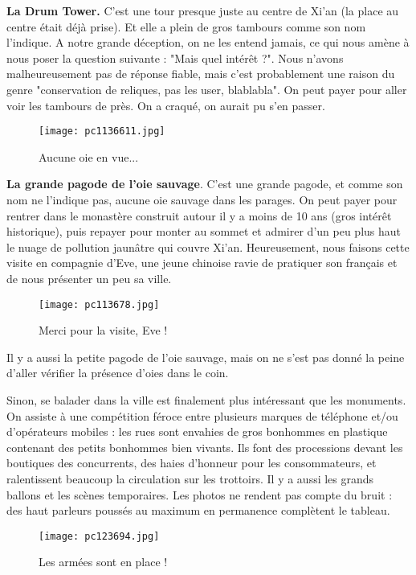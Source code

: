 \documentclass{book}
\begin{document}
\textbf{La Drum Tower.} C'est une tour presque juste au centre de Xi'an (la place au centre était déjà prise). Et elle a plein de gros tambours comme son nom l'indique. A notre grande déception, on ne les entend jamais, ce qui nous amène à nous poser la question suivante : "Mais quel intérêt ?". Nous n'avons malheureusement pas de réponse fiable, mais c'est probablement une raison du genre "conservation de reliques, pas les user, blablabla". On peut payer pour aller voir les tambours de près. On a craqué, on aurait pu s'en passer.


\begin{figure}[h]
\centering
\texttt{[image: pc1136611.jpg]}
\caption*{Aucune oie en vue...}
\end{figure}

\textbf{La grande pagode de l'oie sauvage}. C'est une grande pagode, et comme son nom ne l'indique pas, aucune oie sauvage dans les parages. On peut payer pour rentrer dans le monastère construit autour il y a moins de 10 ans (gros intérêt historique), puis repayer pour monter au sommet et admirer d'un peu plus haut le nuage de pollution jaunâtre qui couvre Xi'an. Heureusement, nous faisons cette visite en compagnie d'Eve, une jeune chinoise ravie de pratiquer son français et de nous présenter un peu sa ville.


\begin{figure}[h]
\centering
\texttt{[image: pc113678.jpg]}
\caption*{Merci pour la visite, Eve !}
\end{figure}

Il y a aussi la petite pagode de l'oie sauvage, mais on ne s'est pas donné la peine d'aller vérifier la présence d'oies dans le coin.

Sinon, se balader dans la ville est finalement plus intéressant que les monuments. On assiste à une compétition féroce entre plusieurs marques de téléphone et/ou d'opérateurs mobiles : les rues sont envahies de gros bonhommes en plastique contenant des petits bonhommes bien vivants. Ils font des processions devant les boutiques des concurrents, des haies d'honneur pour les consommateurs, et ralentissent beaucoup la circulation sur les trottoirs. Il y a aussi les grands ballons et les scènes temporaires. Les photos ne rendent pas compte du bruit : des haut parleurs poussés au maximum en permanence complètent le tableau.


\begin{figure}[h]
\centering
\texttt{[image: pc123694.jpg]}
\caption*{Les armées sont en place !}
\end{figure}
\end{document}
